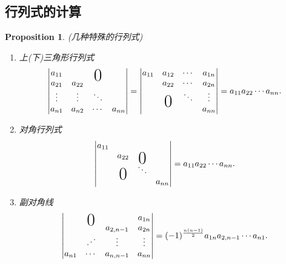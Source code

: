 \documentclass{article}
\newtheorem{proposition}[theorem]{Proposition}
\newcommand\bigzero{\makebox(0,0){\text{\huge0}}} %
\begin{document}
\subsection{行列式的计算}
\begin{proposition}
\rm {\color{red} (几种特殊的行列式)}
\begin{enumerate}
	\item {\color{red}上(下)三角形行列式}
	$$
	\begin{vmatrix}
	a_{11} & & \bigzero\\
	a_{21} & a_{22} \\
	\vdots & \vdots & \ddots \\
	a_{n1} & a_{n2} & \cdots & a_{nn}
	\end{vmatrix} =
	\begin{vmatrix}
	a_{11} & a_{12} & \cdots & a_{1n}\\
	&	a_{22} & \cdots & a_{2n} \\
	&\bigzero& \ddots & \vdots \\
	&&& a_{nn} \\
	\end{vmatrix} = a_{11}a_{22}\cdots a_{nn}.
	$$
	\item {\color{red}对角行列式}
	$$
	\begin{vmatrix}
	a_{11} &&& \\
	&a_{22} &\bigzero& \\
	&\bigzero&\ddots& \\
	&&&a_{nn}
	\end{vmatrix} = a_{11}a_{22}\cdots a_{nn}.
	$$
	\item {\color{red}副对角线}
	$$
	\begin{vmatrix}
	&\bigzero&& a_{1n} \\
	&&a_{2,n-1}& a_{2n} \\
	&\iddots&\vdots& \vdots \\
	a_{n1}&\cdots&a_{n,n-1}& a_{nn} \\
 	\end{vmatrix} = (-1)^{\frac{n(n-1)}{2}}a_{1n}a_{2,{n-1}}\cdots a_{n1}.
	$$
\end{enumerate}
\end{proposition}
\end{document}
